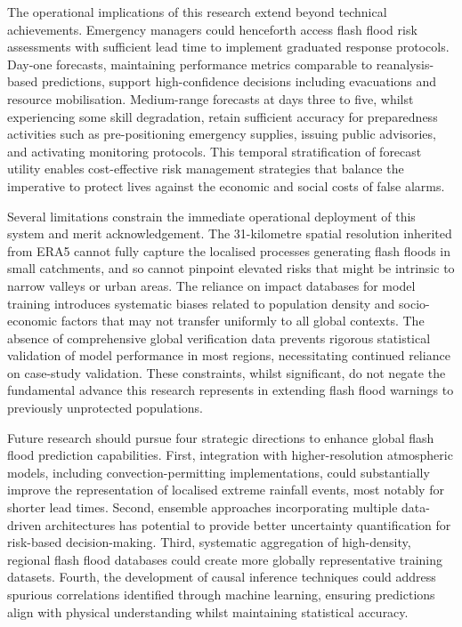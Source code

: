 The operational implications of this research extend beyond technical achievements. Emergency managers could henceforth access flash flood risk assessments with sufficient lead time to implement graduated response protocols. Day-one forecasts, maintaining performance metrics comparable to reanalysis-based predictions, support high-confidence decisions including evacuations and resource mobilisation. Medium-range forecasts at days three to five, whilst experiencing some skill degradation, retain sufficient accuracy for preparedness activities such as pre-positioning emergency supplies, issuing public advisories, and activating monitoring protocols. This temporal stratification of forecast utility enables cost-effective risk management strategies that balance the imperative to protect lives against the economic and social costs of false alarms.

Several limitations constrain the immediate operational deployment of this system and merit acknowledgement. The 31-kilometre spatial resolution inherited from ERA5 cannot fully capture the localised processes generating flash floods in small catchments, and so cannot pinpoint elevated risks that might be intrinsic to narrow valleys or urban areas. The reliance on impact databases for model training introduces systematic biases related to population density and socio-economic factors that may not transfer uniformly to all global contexts. The absence of comprehensive global verification data prevents rigorous statistical validation of model performance in most regions, necessitating continued reliance on case-study validation. These constraints, whilst significant, do not negate the fundamental advance this research represents in extending flash flood warnings to previously unprotected populations.

Future research should pursue four strategic directions to enhance global flash flood prediction capabilities. First, integration with higher-resolution atmospheric models, including convection-permitting implementations, could substantially improve the representation of localised extreme rainfall events, most notably for shorter lead times. Second, ensemble approaches incorporating multiple data-driven architectures has potential to provide better uncertainty quantification for risk-based decision-making. Third, systematic aggregation of high-density, regional flash flood databases could create more globally representative training datasets. Fourth, the development of causal inference techniques could address spurious correlations identified through machine learning, ensuring predictions align with physical understanding whilst maintaining statistical accuracy.

